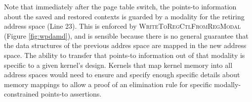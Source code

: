 Note that immediately after the page table switch, the points-to information about the saved and restored contexts is guarded by a modality for the retiring
address space \rtv (Line 23). This is enforced by \textsc{WriteToRegCtlFromRegModal} (Figure \ref{fig:wpdamd}), and is sensible because
there is no general guarantee that the data structures of the previous addres space are mapped in the new address space.
The ability to transfer that points-to information out of that modality is specific to a given kernel's design. 
Kernels that map kernel memory into all address spaces would need to ensure and specify enough specific details about memory mappings to allow a 
proof of an elimination rule for specific modally-constrained points-to assertions.

